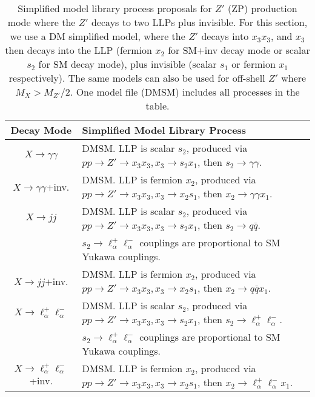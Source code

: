 %
\begin{table}
\begin{center}
\begin{tabular}{ |c|l|} 
 \hline
Decay Mode & Simplified Model Library Process \\
\hline\hline
$X\rightarrow \gamma\gamma$ & DMSM. LLP is scalar $s_2$, produced via $p p \rightarrow Z' \rightarrow x_3 x_3, x_3 \rightarrow s_2 x_1$, then $ s_2 \rightarrow \gamma \gamma$. \\
\hline
$X\rightarrow \gamma\gamma$+inv. &  DMSM. LLP is fermion $x_2$, produced via $p p \rightarrow Z' \rightarrow x_3 x_3, x_3 \rightarrow x_2 s_1$, then $ x_2 \rightarrow \gamma \gamma x_1$.    \\
\hline
$X\rightarrow jj$& DMSM. LLP is scalar $s_2$, produced via $p p \rightarrow Z' \rightarrow x_3 x_3, x_3 \rightarrow s_2 x_1$, then $s_2 \rightarrow q \bar q$.\\
& $s_2 \rightarrow \ell_\alpha^+\ell_\alpha^-$ couplings are proportional to SM Yukawa couplings.\\
\hline
$X\rightarrow jj$+inv.& DMSM. LLP is fermion $x_2$, produced via $p p \rightarrow Z' \rightarrow x_3 x_3, x_3 \rightarrow x_2 s_1$, then $x_2 \rightarrow q \bar q x_1$.\\
\hline
$X\rightarrow \ell_\alpha^+\ell_\alpha^-$ &  DMSM. LLP is scalar $s_2$, produced via $p p \rightarrow Z' \rightarrow x_3 x_3, x_3 \rightarrow s_2 x_1$, then $s_2 \rightarrow \ell_\alpha^+\ell_\alpha^-$.\\
& $s_2 \rightarrow \ell_\alpha^+\ell_\alpha^-$ couplings are proportional to SM Yukawa couplings.\\
\hline
$X\rightarrow \ell_\alpha^+\ell_\alpha^-$+inv. &   DMSM. LLP is fermion $x_2$, produced via $p p \rightarrow Z' \rightarrow x_3 x_3, x_3 \rightarrow x_2 s_1$, then $x_2 \rightarrow \ell_\alpha^+\ell_\alpha^- x_1$.\\

\hline
\end{tabular}
\end{center}
\caption{Simplified model library process proposals for $Z'$ (ZP) production mode where the $Z'$ decays to two LLPs plus invisible. For this section, we  use a DM simplified model, where the $Z'$ decays into $x_3 x_3$, and $x_3$ then decays into the LLP (fermion $x_2$ for SM+inv decay mode or scalar $s_2$ for SM decay mode), plus invisible (scalar $s_1$ or fermion $x_1$ respectively).  The same models can also be used for off-shell $Z'$ where $M_X > M_{Z'}/2$. One model file (DMSM) includes all processes in the table.}\label{tab:Zp_inv_neutral_library}
\end{table}

